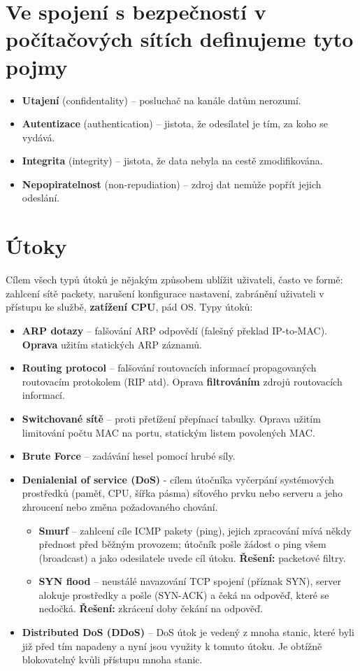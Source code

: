 \section{Ve spojení s bezpečností v počítačových sítích definujeme tyto pojmy}
\begin{itemize}
    \item \textbf{Utajení} (confidentality) – posluchač na kanále datům nerozumí.
    \item \textbf{Autentizace} (authentication) – jistota, že odesílatel je tím, za koho se vydává.
    \item \textbf{Integrita} (integrity) – jistota, že data nebyla na cestě zmodifikována.
    \item \textbf{Nepopiratelnost} (non-repudiation) – zdroj dat nemůže popřít jejich odeslání.
\end{itemize}

\section{Útoky}
Cílem všech typů útoků je nějakým způsobem ublížit uživateli, často ve formě: zahlcení sítě packety, narušení konfigurace nastavení, zabránění uživateli v přístupu ke službě, \textbf{zatížení CPU}, pád OS. Typy útoků:
\begin{itemize}
    \item \textbf{ARP dotazy} -- falšování ARP odpovědí (falešný překlad IP-to-MAC). \textbf{Oprava} užitím statických ARP záznamů.
    \item \textbf{Routing protocol} -- falšování routovacích informací propagovaných routovacím protokolem (RIP atd). Oprava 	\textbf{filtrováním} zdrojů routovacích informací.
    \item \textbf{Switchované sítě} -- proti přetížení přepínací tabulky. Oprava užitím limitování počtu MAC na portu, statickým 	listem povolených MAC.
    \item \textbf{Brute Force} -- zadávání hesel pomocí hrubé síly.
    \item \textbf{Denialenial of service (DoS)} - cílem útočníka vyčerpání systémových prostředků (paměť, CPU, šířka pásma) síťového prvku nebo serveru a jeho zhroucení nebo změna požadovaného chování.
          \begin{itemize}
              \item \textbf{Smurf} -- zahlcení cíle ICMP pakety (ping), jejich zpracování mívá někdy přednost před běžným provozem; útočník pošle žádost o ping všem (broadcast) a jako odesilatele uvede cíl útoku. \textbf{Řešení:} packetové filtry.
              \item \textbf{SYN flood} -- neustálé navazování TCP spojení (příznak SYN), server alokuje prostředky a pošle (SYN-ACK) a čeká na odpověď, které se nedočká. \textbf{Řešení:} zkrácení doby čekání na odpověď.
          \end{itemize}
    \item \textbf{Distributed DoS (DDoS)} -- DoS útok je vedený z mnoha stanic, které byli již před tím napadeny a nyní jsou využity k tomuto útoku. Je obtížně blokovatelný kvůli přístupu mnoha stanic.
\end{itemize}

